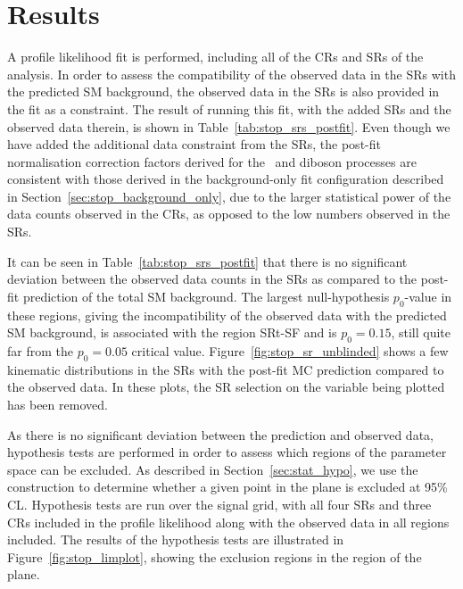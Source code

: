 \section{Results}
\label{sec:stop_results}


A profile likelihood fit is performed, including all of the CRs and SRs of the analysis.
In order to assess the compatibility of the observed data in the SRs with the predicted
SM background, the observed data in the SRs is also provided in the fit as a constraint.
The result of running this fit, with the added SRs and the observed data therein,
is shown in Table~\ref{tab:stop_srs_postfit}.
Even though we have added the additional data constraint from the SRs, the post-fit normalisation
correction factors derived for the \ttbar~and diboson processes are consistent
with those derived in the background-only fit configuration described in Section~\ref{sec:stop_background_only},
due to the larger statistical power of the data counts observed in the CRs, as opposed to the low numbers
observed in the SRs.

It can be seen in Table~\ref{tab:stop_srs_postfit} that there is no significant deviation
between the observed data counts in the SRs as compared to the post-fit prediction of the total SM
background.
The largest null-hypothesis $p_0$-value in these regions, giving the incompatibility of the observed
data with the predicted SM background, is associated with the region SRt-SF and is $p_0 = 0.15$, still
quite far from the $p_0 = 0.05$ critical value.
Figure~\ref{fig:stop_sr_unblinded} shows a few kinematic distributions in the SRs with the post-fit
MC prediction compared to the observed data.
In these plots, the SR selection on the variable being plotted has been removed.

As there is no significant deviation between the prediction and observed data, hypothesis tests are performed in order to assess which regions
of the \bWN parameter space can be excluded.
As described in Section~\ref{sec:stat_hypo}, we use the \cls construction to determine whether
a given point in the \msn plane is excluded at 95\% CL.
Hypothesis tests are run over the \bWN signal grid, with all four SRs and three CRs included in the profile
likelihood along with the observed data in all regions included.
The results of the hypothesis tests are illustrated in Figure~\ref{fig:stop_limplot}, showing the
exclusion regions in the \bWN region of the \msn plane.

